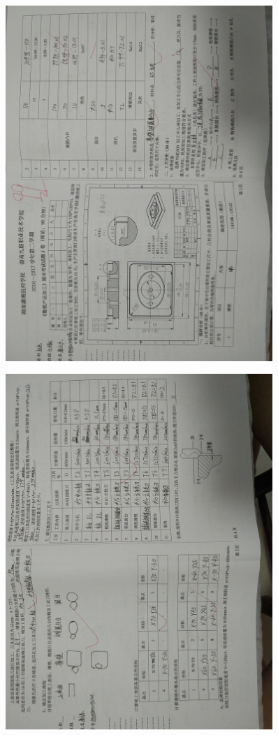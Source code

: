 \documentclass[a4paper,12pt]{article}
\numberwithin{table}{section}
\numberwithin{figure}{section}
\begin{document}
\begin{figure}[!h]
	\centering	
	\includegraphics[width=0.9\textwidth,angle=0]{images/fenshu5}
\end{figure}
\begin{figure}[!h]
	\centering	
	\includegraphics[width=0.9\textwidth,angle=0]{images/fenshu6}
\end{figure}
\end{document}

